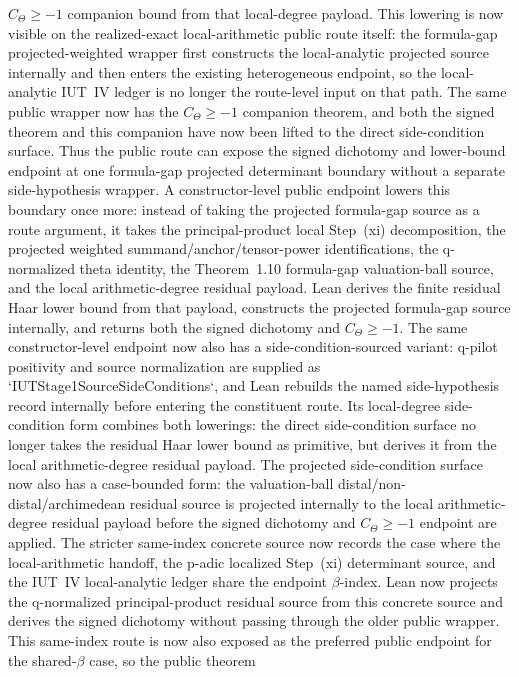 \documentclass[11pt]{article}
\theoremstyle{plain}
\theoremstyle{definition}
\theoremstyle{remark}
\begin{document}
\(C_\Theta \geq -1\) companion bound from that local-degree payload.
This lowering is now visible on the realized-exact local-arithmetic public route
itself: the formula-gap projected-weighted wrapper first constructs the
local-analytic projected source internally and then enters the existing
heterogeneous endpoint, so the local-analytic IUT~IV ledger is no longer the
route-level input on that path.  The same public wrapper now has the
\(C_\Theta\geq -1\) companion theorem, and both the signed theorem and this
companion have now been lifted to the direct side-condition surface.  Thus the
public route can expose the signed dichotomy and lower-bound endpoint at one
formula-gap projected determinant boundary without a separate side-hypothesis
wrapper.
A constructor-level public endpoint lowers this boundary once more: instead of
taking the projected formula-gap source as a route argument, it takes the
principal-product local Step~(xi) decomposition, the projected weighted
summand/anchor/tensor-power identifications, the q-normalized theta identity,
the Theorem~1.10 formula-gap valuation-ball source, and the local
arithmetic-degree residual payload.  Lean derives the finite residual Haar
lower bound from that payload, constructs the projected formula-gap source
internally, and returns both the signed dichotomy and \(C_\Theta\geq -1\).
The same constructor-level endpoint now also has a side-condition-sourced
variant: q-pilot positivity and source normalization are supplied as
`IUTStage1SourceSideConditions`, and Lean rebuilds the named side-hypothesis
record internally before entering the constituent route.  Its local-degree
side-condition form combines both lowerings: the direct side-condition surface
no longer takes the residual Haar lower bound as primitive, but derives it from
the local arithmetic-degree residual payload.  The projected side-condition
surface now also has a case-bounded form: the valuation-ball
distal/non-distal/archimedean residual source is projected internally to the
local arithmetic-degree residual payload before the signed dichotomy and
\(C_\Theta\geq -1\) endpoint are applied.
The stricter same-index concrete source now records the case where the
local-arithmetic handoff, the p-adic localized Step~(xi) determinant source,
and the IUT~IV local-analytic ledger share the endpoint \(\beta\)-index.  Lean
now projects the q-normalized principal-product residual source from this
concrete source and derives the signed dichotomy without passing through the
older public wrapper.  This same-index route is now also exposed as the
preferred public endpoint for the shared-\(\beta\) case, so the public theorem
\end{document}
